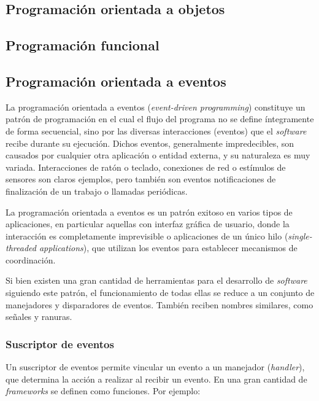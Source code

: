 \subsection{Programación orientada a objetos}

\subsection{Programación funcional}

\subsection{Programación orientada a eventos}
\label{teoria:eventdriven}

La programación orientada a eventos (\textit{event-driven programming}) constituye un patrón de programación en el cual el flujo del programa no se define íntegramente de forma secuencial, sino por las diversas interacciones (eventos) que el \textit{software} recibe durante su ejecución. Dichos eventos, generalmente impredecibles, son causados por cualquier otra aplicación o entidad externa, y su naturaleza es muy variada. Interacciones de ratón o teclado, conexiones de red o estímulos de sensores son claros ejemplos, pero también son eventos notificaciones de finalización de un trabajo o llamadas periódicas.

La programación orientada a eventos es un patrón exitoso en varios tipos de aplicaciones, en particular aquellas con interfaz gráfica de usuario, donde la interacción es completamente imprevisible o aplicaciones de un único hilo (\textit{single-threaded applications}), que utilizan los eventos para establecer mecanismos de coordinación. 

Si bien existen una gran cantidad de herramientas para el desarrollo de \textit{software} siguiendo este patrón, el funcionamiento de todas ellas se reduce a un conjunto de manejadores y disparadores de eventos. También reciben nombres similares, como señales y ranuras.

\subsubsection{Suscriptor de eventos}

Un suscriptor de eventos permite vincular un evento a un manejador (\textit{handler}), que determina la acción a realizar al recibir un evento. En una gran cantidad de \textit{frameworks} se definen como funciones. Por ejemplo:

